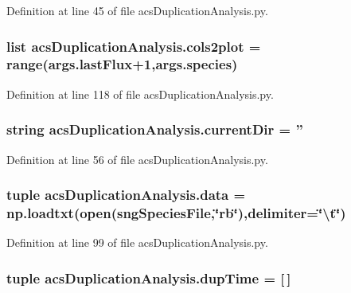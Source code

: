 Definition at line 45 of file acs\-Duplication\-Analysis.\-py.

\hypertarget{a00094_aeb0384baa8b5272c0a730d55994c3b1c}{
\subsubsection[{cols2plot}]{\setlength{\rightskip}{0pt plus 5cm}list acs\-Duplication\-Analysis.\-cols2plot = range(args.\-last\-Flux+1,{\bf args.\-species})}}\label{a00094_aeb0384baa8b5272c0a730d55994c3b1c}


Definition at line 118 of file acs\-Duplication\-Analysis.\-py.

\hypertarget{a00094_ab5558c536d6d2eec449ad9b978bff5ab}{
\subsubsection[{current\-Dir}]{\setlength{\rightskip}{0pt plus 5cm}string acs\-Duplication\-Analysis.\-current\-Dir = ''}}\label{a00094_ab5558c536d6d2eec449ad9b978bff5ab}


Definition at line 56 of file acs\-Duplication\-Analysis.\-py.

\hypertarget{a00094_ae11ddb8ad49a2afeaa7276e3e1a59a54}{
\subsubsection[{data}]{\setlength{\rightskip}{0pt plus 5cm}tuple acs\-Duplication\-Analysis.\-data = np.\-loadtxt(open(sng\-Species\-File,\char`\"{}rb\char`\"{}),delimiter=\char`\"{}\textbackslash{}t\char`\"{})}}\label{a00094_ae11ddb8ad49a2afeaa7276e3e1a59a54}


Definition at line 99 of file acs\-Duplication\-Analysis.\-py.

\hypertarget{a00094_a71f19251e2a07b86d019204de83241ec}{
\subsubsection[{dup\-Time}]{\setlength{\rightskip}{0pt plus 5cm}tuple acs\-Duplication\-Analysis.\-dup\-Time = \mbox{[}$\,$\mbox{]}}}\label{a00094_a71f19251e2a07b86d019204de83241ec}


